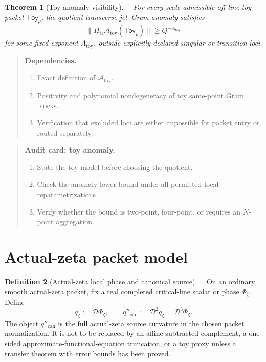 \documentclass[11pt,a4paper]{amsart}
\newcommand{\Status}[1]{\textnormal{\fbox{\scriptsize\textsf{#1}}}}
\newcommand{\Core}{\Status{CORE}}
\newcommand{\Open}{\Status{OPEN}}
\newcommand{\Ph}{\Phi}
\newcommand{\D}{\mathcal D}
\newcommand{\Toy}{\mathsf{Toy}}
\newcommand{\Scale}{Q}
\newcommand{\can}{\mathrm{can}}
\newcommand{\toy}{\mathrm{toy}}
\newcommand{\trans}{\mathrm{tr}}
\theoremstyle{plain}
\newtheorem{theorem}{Theorem}[section]
\theoremstyle{definition}
\newtheorem{definition}[theorem]{Definition}
\newenvironment{audit}[1]{%
  \begin{quote}\noindent\textbf{Audit card: #1.}\par\smallskip\small
}{\end{quote}}
\newenvironment{dependencies}{%
  \begin{quote}\noindent\textbf{Dependencies.}\par\smallskip\small
  \begin{enumerate}[label=\textup{D\arabic*.},leftmargin=*]
}{\end{enumerate}\end{quote}}
\begin{document}
\begin{theorem}[Toy anomaly visibility]
\label{thm:toy-anomaly-visibility-target}
\Core\ \Open\
For every scale-admissible off-line toy packet \(\Toy_\rho\), the quotient-transverse jet--Gram anomaly satisfies
\[
        \|\Pi_{\trans}\mathcal A_{\toy}(\Toy_\rho)\|
        \ge \Scale^{-A_{\toy}}
\]
for some fixed exponent \(A_{\toy}\), outside explicitly declared singular or transition loci.
\end{theorem}

\begin{dependencies}
\item Exact definition of \(\mathcal A_{\toy}\).
\item Positivity and polynomial nondegeneracy of toy same-point Gram blocks.
\item Verification that excluded loci are either impossible for packet entry or routed separately.
\end{dependencies}

\begin{audit}{toy anomaly}
\begin{enumerate}[label=\textup{A\arabic*.},leftmargin=*]
\item State the toy model before choosing the quotient.
\item Check the anomaly lower bound under all permitted local reparametrizations.
\item Verify whether the bound is two-point, four-point, or requires an \(N\)-point aggregation.
\end{enumerate}
\end{audit}

\section{Actual-zeta packet model}
\label{sec:actual-zeta-packet-model}

\begin{definition}[Actual-zeta local phase and canonical source]
\label{def:actual-zeta-local-phase-canonical-source}
\Core\ \Open\
On an ordinary smooth actual-zeta packet, fix a real completed critical-line scalar or phase \(\Ph_\zeta\).  Define
\[
        q_\zeta:=\D\Ph_\zeta,
        \qquad
        q''_{\can}:=\D^2q_\zeta=\D^3\Ph_\zeta.
\]
The object \(q''_{\can}\) is the full actual-zeta source curvature in the chosen packet normalization.  It is not to be replaced by an affine-subtracted complement, a one-sided approximate-functional-equation truncation, or a toy proxy unless a transfer theorem with error bounds has been proved.
\end{definition}
\end{document}
